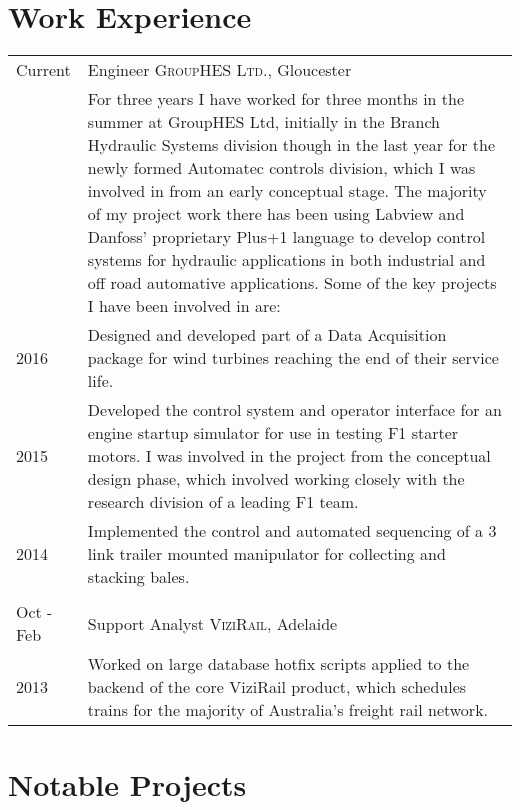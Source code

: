 \documentclass[10pt,a4paper]{article}
\def \rowdiv {\multicolumn{2}{c}{} \\}
\begin{document}
\section{Work Experience}
    \begin{tabular}{R{2cm}|p{12cm}}
        Current     & Engineer \textsc{GroupHES Ltd.}, Gloucester \\
                    & \footnotesize{For three years I have worked for three months in the summer at GroupHES Ltd, initially in the Branch Hydraulic Systems division though in the last year for the newly formed Automatec controls division, which I was involved in from an early conceptual stage. The majority of my project work there has been using Labview and Danfoss' proprietary Plus+1 language to develop control systems for hydraulic applications in both industrial and off road automative applications. Some of the key projects I have been involved in are:} \\
        2016        & \footnotesize{Designed and developed part of a Data Acquisition package for wind turbines reaching the end of their service life.} \\
        2015        & \footnotesize{Developed the control system and operator interface for an engine startup simulator for use in testing F1 starter motors. I was involved in the project from the conceptual design phase, which involved working closely with the research division of a leading F1 team.} \\
        2014        & \footnotesize{Implemented the control and automated sequencing of a 3 link trailer mounted manipulator for collecting and stacking bales.} \\ \rowdiv
        Oct - Feb   & Support Analyst \textsc{ViziRail}, Adelaide \\
        2013        & \footnotesize{Worked on large database hotfix scripts applied to the backend of the core ViziRail product, which schedules trains for the majority of Australia's freight rail network.} \\
    \end{tabular}

\section{Notable Projects}
\end{document}
